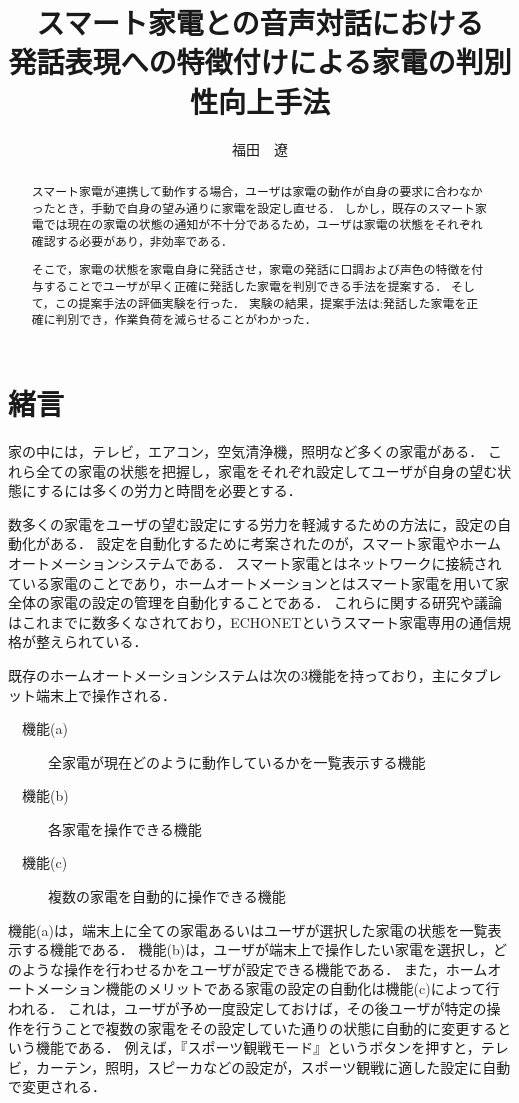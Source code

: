 \documentclass[a4j,12pt,twoside]{jreport}
\author{福田　遼}
\title{スマート家電との音声対話における\\
発話表現への特徴付けによる家電の判別性向上手法}
\begin{document}
\maketitle

\begin{abstract}

スマート家電が連携して動作する場合，ユーザは家電の動作が自身の要求に合わなかったとき，手動で自身の望み通りに家電を設定し直せる．
しかし，既存のスマート家電では現在の家電の状態の通知が不十分であるため，ユーザは家電の状態をそれぞれ確認する必要があり，非効率である．

そこで，家電の状態を家電自身に発話させ，家電の発話に口調および声色の特徴を付与することでユーザが早く正確に発話した家電を判別できる手法を提案する．
そして，この提案手法の評価実験を行った．
実験の結果，提案手法は:発話した家電を正確に判別でき，作業負荷を減らせることがわかった．
\end{abstract}

\begin{contents}
\tableofcontents %
\end{contents}

\chapter{緒言}
家の中には，テレビ，エアコン，空気清浄機，照明など多くの家電がある．
これら全ての家電の状態を把握し，家電をそれぞれ設定してユーザが自身の望む状態にするには多くの労力と時間を必要とする．

数多くの家電をユーザの望む設定にする労力を軽減するための方法に，設定の自動化がある．
設定を自動化するために考案されたのが，スマート家電やホームオートメーションシステムである．
スマート家電とはネットワークに接続されている家電のことであり，ホームオートメーションとはスマート家電を用いて家全体の家電の設定の管理を自動化することである．
これらに関する研究や議論はこれまでに数多くなされており\cite{Grinter}\cite{TRON}，ECHONET\cite{ECHO}というスマート家電専用の通信規格が整えられている．

既存のホームオートメーションシステムは次の3機能を持っており，主にタブレット端末上で操作される．
\begin{description}
	\item [　機能(a)]全家電が現在どのように動作しているかを一覧表示する機能
	\item [　機能(b)]各家電を操作できる機能
	\item [　機能(c)]複数の家電を自動的に操作できる機能
\end{description}
機能(a)は，端末上に全ての家電あるいはユーザが選択した家電の状態を一覧表示する機能である．
機能(b)は，ユーザが端末上で操作したい家電を選択し，どのような操作を行わせるかをユーザが設定できる機能である．
また，ホームオートメーション機能のメリットである家電の設定の自動化は機能(c)によって行われる．
これは，ユーザが予め一度設定しておけば，その後ユーザが特定の操作を行うことで複数の家電をその設定していた通りの状態に自動的に変更するという機能である．
例えば，『スポーツ観戦モード』というボタンを押すと，テレビ，カーテン，照明，スピーカなどの設定が，スポーツ観戦に適した設定に自動で変更される．
\end{document}
